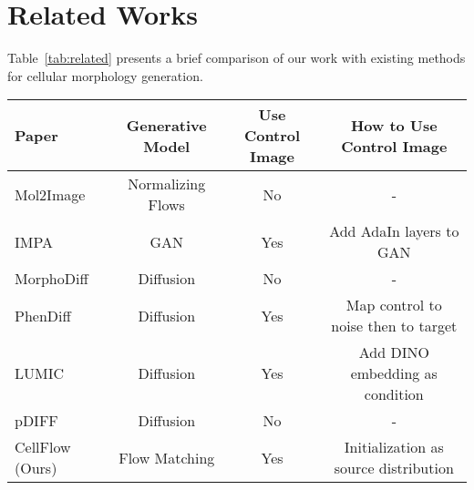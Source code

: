 \section{Related Works}
\label{sec:related_appendix}

Table~\ref{tab:related} presents a brief comparison of our work with existing methods for cellular morphology generation.

\begin{table*}[htbp]
    \small
    \centering
    \setlength\tabcolsep{6pt}
    \renewcommand{\arraystretch}{1.1}
    \begin{tabular}{lccc}
    \toprule
    Paper & Generative Model & Use Control Image & How to Use Control Image \\
    \midrule
    Mol2Image~\cite{yang2021mol2image} & Normalizing Flows & No & - \\
    IMPA~\cite{palma2023predicting} & GAN & Yes & Add AdaIn layers to GAN \\
    MorphoDiff~\cite{navidi2024morphodiff} & Diffusion & No & - \\
    PhenDiff~\cite{bourou2024phendiff} & Diffusion & Yes & Map control to noise then to target \\
    LUMIC~\cite{hung2024lumic} & Diffusion & Yes & Add DINO embedding as condition \\
    pDIFF~\cite{cook2024diffusion} & Diffusion & No & - \\
    CellFlow (Ours) & Flow Matching & Yes & Initialization as source distribution \\
    \bottomrule
    \end{tabular}
    \caption{\textbf{Related works on cell morphology generation.}}
    \label{tab:related}
\end{table*}
